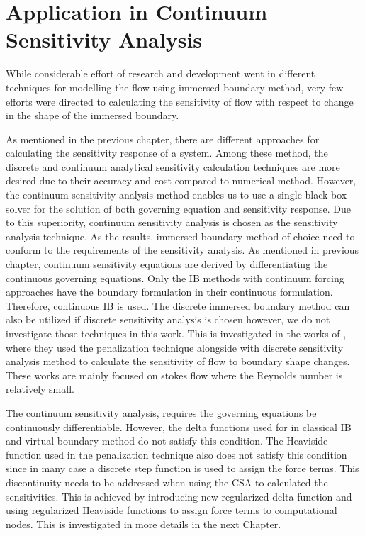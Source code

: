

\section{Application in Continuum Sensitivity Analysis}
While considerable effort of research and development went in different techniques for modelling the flow using immersed boundary method, very few efforts were directed to calculating the sensitivity of flow with respect to change in the shape of the immersed boundary.

As mentioned in the previous chapter, there are different approaches for calculating the sensitivity response of a system. Among these method, the discrete and continuum analytical sensitivity calculation techniques are more desired due to their accuracy and cost compared to numerical method. However, the continuum sensitivity analysis method enables us to use a single black-box solver for the solution of both governing equation and sensitivity response. Due to this superiority, continuum sensitivity analysis is chosen as the sensitivity analysis technique. As the results, immersed boundary method of choice need to conform to the requirements of the sensitivity analysis. As mentioned in previous chapter, continuum sensitivity equations are derived by differentiating the continuous governing equations. Only the IB methods with continuum forcing approaches have the boundary formulation in their continuous formulation. Therefore, continuous IB is used. The discrete immersed boundary method can also be utilized if discrete sensitivity analysis is chosen however, we do not investigate those techniques in this work. This is investigated in the works of \cite{kreissl2011explicit, borrvall2003topology, challis2009level}, where they used the penalization technique alongside with discrete sensitivity analysis method to calculate the sensitivity of flow to boundary shape changes. These works are mainly focused on stokes flow where the Reynolds number is relatively small.

The continuum sensitivity analysis, requires the governing equations be continuously differentiable. However, the delta functions used for in classical IB and virtual boundary method do not satisfy this condition. The Heaviside function used in the penalization technique also does not satisfy this condition since in many case a discrete step function is used to assign the force terms. This discontinuity needs to be addressed when using the CSA to calculated the sensitivities. This is achieved by introducing new regularized delta function and using regularized Heaviside functions to assign force terms to computational nodes. This is investigated in more details in the next Chapter.

